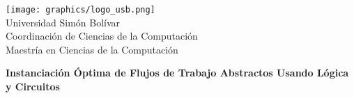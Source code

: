 \begin{titlepage}

\begin{flushleft}
\texttt{[image: graphics/logo\_usb.png]} \\
Universidad Simón Bolívar \\
Coordinación de Ciencias de la Computación \\
Maestría en Ciencias de la Computación \\
\end{flushleft}

\vspace{0.8cm}

\begin{center}
{\large \bf \textsf{Instanciación Óptima de Flujos de Trabajo Abstractos Usando Lógica y Circuitos}}
\end{center}

\vspace{0.2cm}


\end{titlepage}
